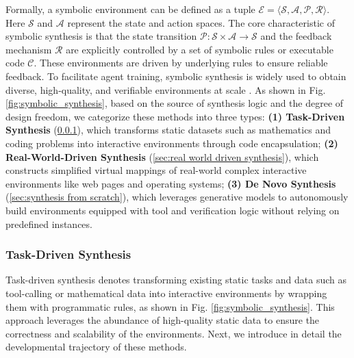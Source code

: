\documentclass{llmxive}
\begin{document}
Formally, a symbolic environment can be defined as a tuple $\mathcal{E} = \langle \mathcal{S}, \mathcal{A}, \mathcal{P}, \mathcal{R} \rangle$. Here $\mathcal{S}$ and $\mathcal{A}$ represent the state and action spaces. The core characteristic of symbolic synthesis is that the state transition ${\mathcal{P}}: \mathcal{S} \times \mathcal{A} \rightarrow \mathcal{S}$ and the feedback mechanism $\mathcal{R}$ are explicitly controlled by a set of symbolic rules or executable code $\mathcal{C}$. These environments are driven by underlying rules to ensure reliable feedback. To facilitate agent training, symbolic synthesis is widely used to obtain diverse, high-quality, and verifiable environments at scale \cite{DeepSeek-V3.2, LongCat-Flash-Thinking-2601, MiMo-V2-Flash}. As shown in Fig. \ref{fig:symbolic_synthesis}, based on the source of synthesis logic and the degree of design freedom, we categorize these methods into three types: \textbf{(1) Task-Driven Synthesis} (\cref{sec:task driven synthesis}), which transforms static datasets such as mathematics and coding problems into interactive environments through code encapsulation; \textbf{(2) Real-World-Driven Synthesis} (\cref{sec:real world driven synthesis}), which constructs simplified virtual mappings of real-world complex interactive environments like web pages and operating systems; \textbf{(3) De Novo Synthesis} (\cref{sec:synthesis from scratch}), which leverages generative models to autonomously build environments equipped with tool and verification logic without relying on predefined instances.



\subsubsection{Task-Driven Synthesis}
\label{sec:task driven synthesis}

Task-driven synthesis denotes transforming existing static tasks \cite{Generalized_Planning, BYTESIZED32, Exploration_Walk, Text2World, WorldCoder} and data such as tool-calling \cite{EnvScaler, AgentScaler, Agent_CPT} or mathematical data \cite{Nemotron-Terminal, LLM-in-Sandbox} into interactive environments by wrapping them with programmatic rules, as shown in Fig. \ref{fig:symbolic_synthesis}. This approach leverages the abundance of high-quality static data to ensure the correctness and scalability of the environments. Next, we introduce in detail the developmental trajectory of these methods.
\end{document}
